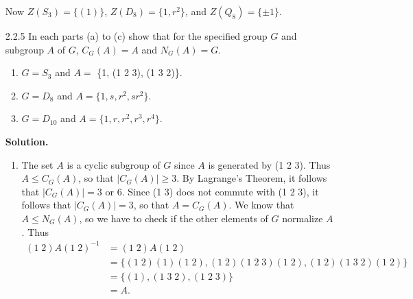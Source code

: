 \begin{enumerate}
      Now $Z(S_3) = \{(1)\}$, $Z(D_8) = \{1, r^2\}$, and $Z(Q_8) = \{\pm1\}$.
   \item[2.2.5]   In each parts (a) to (c) show that for the specified group $G$
                  and subgroup $A$ of $G$, $C_G(A) = A$ and $N_G(A) = G$.
                  \begin{enumerate}
                     \item $G = S_3$ and $A = $ \{1, (1 2 3), (1 3 2)\}.
                     \item $G = D_8$ and $A = \{1, s, r^2, sr^2\}$.
                     \item $G = D_{10}$ and $A = \{1, r, r^2, r^3, r^4\}$.
                  \end{enumerate}
      
      \textbf{Solution.}
      
      \begin{enumerate}
         \item The set $A$ is a cyclic subgroup of $G$ since $A$ is generated by
               (1 2 3). Thus $A \le C_G(A)$, so that $|C_G(A)| \ge 3$. By
               Lagrange's Theorem, it follows that $|C_G(A)| = 3$ or 6. Since
               (1 3) does not commute with (1 2 3), it follows that
               $|C_G(A)| = 3$, so that $A = C_G(A)$. We know that
               $A \le N_G(A)$, so we have to check if the other elements of $G$
               normalize $A$. Thus
               \begin{align*}
                  (1\;2)A(1\;2)^{-1} &= (1\;2)A(1\;2) \\
                     &= \{(1\;2)(1)(1\;2), (1\;2)(1\;2\;3)(1\;2),
                          (1\;2)(1\;3\;2)(1\;2)\} \\
                     &= \{(1), (1\;3\;2), (1\;2\;3)\} \\
                     &= A.
               \end{align*}
               

\end{enumerate}
\end{enumerate}
